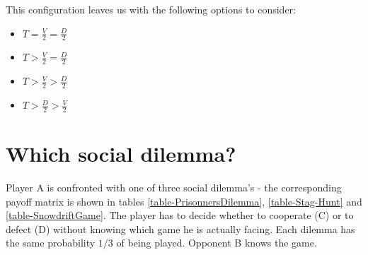 \documentclass[a4paper, 11pt]{article}
\begin{document}
This configuration leaves us with the following options to consider:
\begin{itemize}[noitemsep]
  \item $T=\frac{V}{2}=\frac{D}{2}$
  \item $T>\frac{V}{2}=\frac{D}{2}$
  \item $T>\frac{V}{2}>\frac{D}{2}$
  \item $T>\frac{D}{2}>\frac{V}{2}$
  
\end{itemize}





\newpage
\section{Which social dilemma?}

Player A is confronted with one of three social dilemma's - the corresponding payoff matrix is shown in tables \ref{table-PrisonnersDilemma}, \ref{table-Stag-Hunt} and \ref{table-SnowdriftGame}. The player has to decide whether to cooperate (C) or to defect (D) without knowing which game he is actually facing. Each dilemma has the same probability $1/3$ of being played. Opponent B knows the game.
\end{document}
